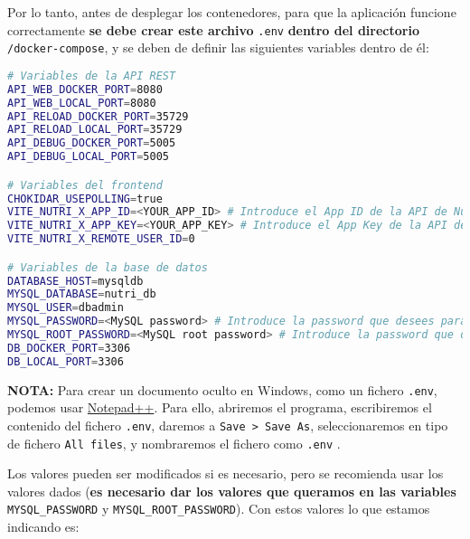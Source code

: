 Por lo tanto, antes de desplegar los contenedores, para que la aplicación funcione correctamente \textbf{se debe crear este archivo} \verb,.env, \textbf{dentro del directorio} \verb,/docker-compose,, y se deben de definir las siguientes variables dentro de él:

\begin{lstlisting}[language=Bash]
# Variables de la API REST
API_WEB_DOCKER_PORT=8080
API_WEB_LOCAL_PORT=8080
API_RELOAD_DOCKER_PORT=35729
API_RELOAD_LOCAL_PORT=35729
API_DEBUG_DOCKER_PORT=5005
API_DEBUG_LOCAL_PORT=5005

# Variables del frontend
CHOKIDAR_USEPOLLING=true
VITE_NUTRI_X_APP_ID=<YOUR_APP_ID> # Introduce el App ID de la API de Nutritionix
VITE_NUTRI_X_APP_KEY=<YOUR_APP_KEY> # Introduce el App Key de la API de Nutritionix
VITE_NUTRI_X_REMOTE_USER_ID=0

# Variables de la base de datos
DATABASE_HOST=mysqldb
MYSQL_DATABASE=nutri_db
MYSQL_USER=dbadmin
MYSQL_PASSWORD=<MySQL password> # Introduce la password que desees para el usuario dbadmin
MYSQL_ROOT_PASSWORD=<MySQL root password> # Introduce la password que desees para el usuario root
DB_DOCKER_PORT=3306
DB_LOCAL_PORT=3306
\end{lstlisting}

\textbf{NOTA:} Para crear un documento oculto en Windows, como un fichero \verb,.env,, podemos usar \href{https://notepad-plus-plus.org/}{Notepad++}. Para ello, abriremos el programa, escribiremos el contenido del fichero \verb,.env,, daremos a \verb,Save > Save As,, seleccionaremos en tipo de fichero \verb,All files,, y nombraremos el fichero como \verb,.env, \cite{stack-overflow:env-file-windows}.

Los valores pueden ser modificados si es necesario, pero se recomienda usar los valores dados (\textbf{es necesario dar los valores que queramos en las variables} \verb,MYSQL_PASSWORD, y \verb,MYSQL_ROOT_PASSWORD,). Con estos valores lo que estamos indicando es:

